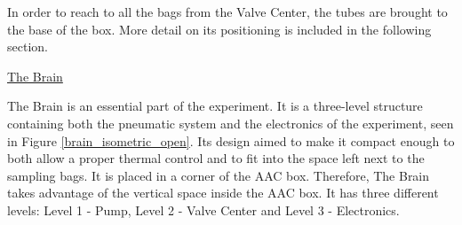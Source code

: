 

In order to reach to all the bags from the Valve Center, the tubes are brought to the base of the box. More detail on its positioning is included in the following section. 


\bigskip
\underline{The Brain}
\label{subsec:brain}

\smallskip
The Brain is an essential part of the experiment. It is a three-level structure containing both the pneumatic system and the electronics of the experiment, seen in Figure \ref{brain_isometric_open}. Its design aimed to make it compact enough to both allow a proper thermal control and to fit into the space left next to the sampling bags. It is placed in a corner of the AAC box. Therefore, The Brain takes advantage of the vertical space inside the AAC box. It has three different levels: Level 1 - Pump, Level 2 - Valve Center and Level 3 - Electronics.


